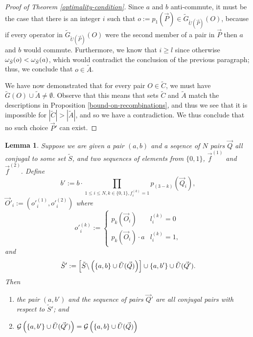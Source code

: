 \documentclass[twocolumn,showpacs,preprintnumbers,amsmath,amssymb,nofootinbib,pra,floatfix]{revtex4-1}
\newtheorem{lemma}{Lemma}
\newcommand{\lst}{\vec}
\newcommand{\set}{\tilde}
\newcommand{\genfun}{\mathcal{G}}
\begin{document}
\begin{proof}[Proof of Theorem \ref{optimality-condition}]
Since $a$ and $b$ anti-commute, it must be the case that there is an integer $i$ such that $o:=p_1(\lst P)\in \set G_{\set U(\lst P)}(O)$, because if every operator in $\set G_{\set U(\lst P)}(O)$ were the second member of a pair in $\lst P$ then $a$ and $b$ would commute.  Furthermore, we know that $i\ge l$ since otherwise $\om_{\set S}(o) < \om_{\set S}(a)$, which would contradict the conclusion of the previous paragraph;  thus, we conclude that $o\in \set A$.

We have now demonstrated that for every pair $O\in\set C$, we must have $\set G(O)\cup\set A \ne\emptyset$.  Observe that this means that sets $\set C$ and $\set A$ match the descriptions in Proposition \ref{bound-on-recombinations}, and thus we see that it is impossible for $|\set C|>|\set A|$, and so we have a contradiction.  We thus conclude that no such choice $\lst P'$ can exist.
\end{proof}
\begin{lemma}
\label{multiple-recombinations}
Suppose we are given a pair $(a,b)$ and a seqence of $N$ pairs $\lst Q$ all conjugal to some set $\set S$, and two sequences of elements from $\{0,1\}$, $\lst f^{(1)}$ and $\lst f^{(2)}$.  Define
$$b':=b\cdot\prod_{1 \le i \le N, k \in \{0,1\}, f^{(k)}_i=1}p_{(3-k)}(\lst Q_i),$$
$\lst O'_i := (o'^{(1)}_i,o'^{(2)}_i)$ where
$$o'^{(k)}_i :=
\begin{cases}
p_k(\lst O_i) & l^{(k)}_i = 0\\
p_k(\lst O_i) \cdot a & l^{(k)}_i = 1,
\end{cases}
$$
and
$$\set S' := \left[\set S\backslash\paren{\{a,b\} \cup \set U(\lst Q)}\right]\cup \{a,b'\} \cup \set U(\lst Q').$$
Then
\begin{enumerate}
\item the pair $(a,b')$ and the sequence of pairs $\lst Q'$ are all conjugal pairs with respect to $\set S'$; and
\item $\genfun\paren{\{a,b'\}\cup \set U(\lst Q')}=\genfun\paren{\{a,b\}\cup \set U(\lst Q)}$
\end{enumerate}
\end{lemma}
\end{document}
